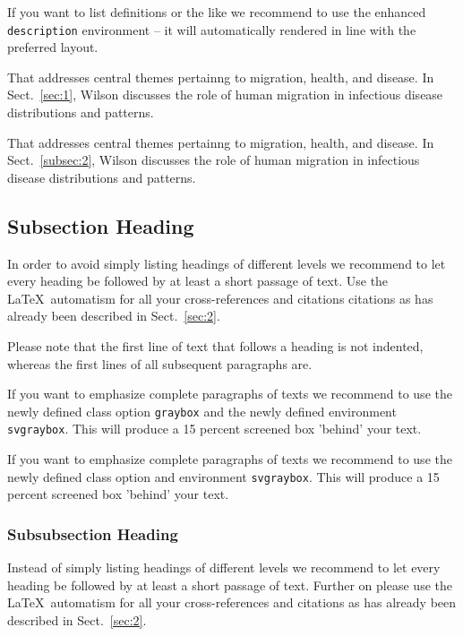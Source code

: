\documentclass[graybox]{SNmult}
\begin{document}
If you want to list definitions or the like we recommend to use the enhanced \verb|description| environment -- it will automatically rendered in line with the preferred layout.

\begin{description}[Type 1]
\item[Type 1]{That addresses central themes pertainng to migration, health, and disease. In Sect.~\ref{sec:1}, Wilson discusses the role of human migration in infectious disease distributions and patterns.}
\item[Type 2]{That addresses central themes pertainng to migration, health, and disease. In Sect.~\ref{subsec:2}, Wilson discusses the role of human migration in infectious disease distributions and patterns.}
\end{description}

\subsection{Subsection Heading} %
In order to avoid simply listing headings of different levels we recommend to let every heading be followed by at least a short passage of text. Use the \LaTeX\ automatism for all your cross-references and citations citations as has already been described in Sect.~\ref{sec:2}.

Please note that the first line of text that follows a heading is not indented, whereas the first lines of all subsequent paragraphs are.

\begin{svgraybox}
If you want to emphasize complete paragraphs of texts we recommend to use the newly defined class option \verb|graybox| and the newly defined environment \verb|svgraybox|. This will produce a 15 percent screened box 'behind' your text.

If you want to emphasize complete paragraphs of texts we recommend to use the newly defined class option and environment \verb|svgraybox|. This will produce a 15 percent screened box 'behind' your text.
\end{svgraybox}


\subsubsection{Subsubsection Heading}
Instead of simply listing headings of different levels we recommend to let every heading be followed by at least a short passage of text.  Further on please use the \LaTeX\ automatism for all your cross-references and citations as has already been described in Sect.~\ref{sec:2}.
\end{document}
